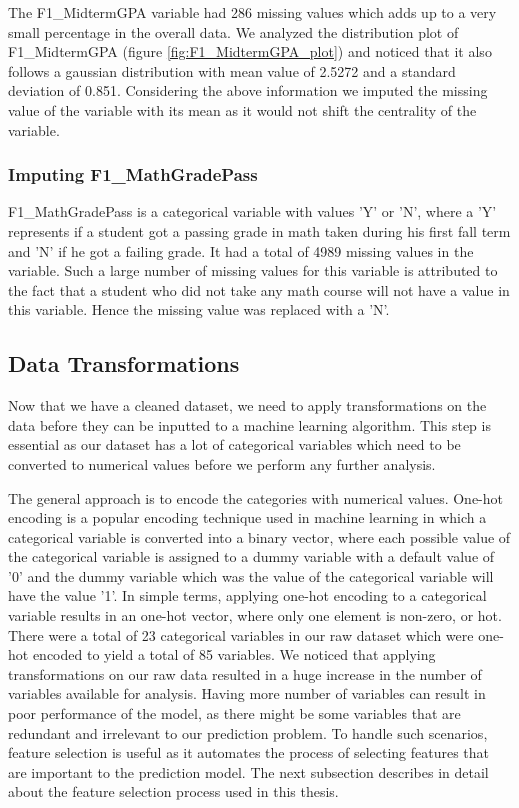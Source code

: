 \documentclass[11pt,openright]{report}
\begin{document}
The F1\_MidtermGPA variable had 286 missing values which adds up to a very small percentage in the overall data. We analyzed the distribution plot of F1\_MidtermGPA (figure \ref{fig:F1_MidtermGPA_plot}) and noticed that it also follows a gaussian distribution with mean value of 2.5272 and a standard deviation of 0.851. Considering the above information we imputed the missing value of the variable with its mean as it would not shift the centrality of the variable.

\subsubsection {Imputing F1\_MathGradePass}
F1\_MathGradePass is a categorical variable with values 'Y' or 'N', where a 'Y' represents if a student got a passing grade in math taken during his first fall term and 'N' if he got a failing grade. It had a total of 4989 missing values in the variable. Such a large number of missing values for this variable is attributed to the fact that a student who did not take any math course will not have a value in this variable. Hence the missing value was replaced with a 'N'.

\subsection {Data Transformations}
Now that we have a cleaned dataset, we need to apply transformations on the data before they can be inputted to a machine learning algorithm. This step is essential as our dataset has a lot of categorical variables which need to be converted to numerical values before we perform any further analysis. 

The general approach is to encode the categories with numerical values. One-hot encoding is a popular encoding technique used in machine learning in which a categorical variable is converted into a binary vector, where each possible value of the categorical variable is assigned to a dummy variable with a default value of '0' and the dummy variable which was the value of the categorical variable will have the value '1'. In simple terms, applying one-hot encoding to a categorical variable results in an one-hot vector, where only one element is non-zero, or hot. There were a total of 23 categorical variables in our raw dataset which were one-hot encoded to yield a total of 85 variables. We noticed that applying transformations on our raw data resulted in a huge increase in the number of variables available for analysis. Having more number of variables can result in poor performance of the model, as there might be some variables that are redundant and irrelevant to our prediction problem. To handle such scenarios, feature selection is useful as it automates the process of selecting features that are important to the prediction model. The next subsection describes in detail about the feature selection process used in this thesis.
\end{document}
